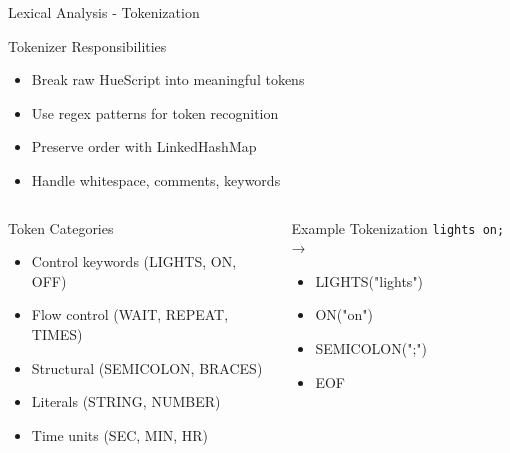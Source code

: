 \documentclass{beamer}
\begin{document}
\begin{frame}{Lexical Analysis - Tokenization}
\begin{block}{Tokenizer Responsibilities}
\begin{itemize}
    \item Break raw HueScript into meaningful tokens
    \item Use regex patterns for token recognition
    \item Preserve order with LinkedHashMap
    \item Handle whitespace, comments, keywords
\end{itemize}
\end{block}

\begin{columns}
\begin{column}{0.5\textwidth}
\begin{block}{Token Categories}
\begin{itemize}
    \item Control keywords (LIGHTS, ON, OFF)
    \item Flow control (WAIT, REPEAT, TIMES)
    \item Structural (SEMICOLON, BRACES)
    \item Literals (STRING, NUMBER)
    \item Time units (SEC, MIN, HR)
\end{itemize}
\end{block}
\end{column}
\begin{column}{0.5\textwidth}
\begin{block}{Example Tokenization}
\texttt{lights on;} →
\begin{itemize}
    \item LIGHTS("lights")
    \item ON("on")  
    \item SEMICOLON(";")
    \item EOF
\end{itemize}
\end{block}
\end{column}
\end{columns}
\end{frame}
\end{document}
